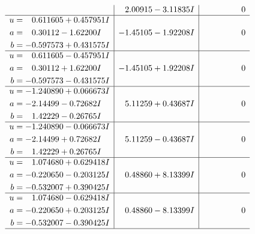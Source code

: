 \documentclass[1p]{elsarticle_modified}
\theoremstyle{definition}
\begin{document}
$$\begin{array}{c|c|c}
 & \phantom{-}2.00915 - 3.11835 I & \phantom{-0.000000 } 0 \\ \hline\begin{aligned}
u &= \phantom{-}0.611605 + 0.457951 I \\
a &= \phantom{-}0.30112 - 1.62200 I \\
b &= -0.597573 + 0.431575 I\end{aligned}
 & -1.45105 - 1.92208 I & \phantom{-0.000000 } 0 \\ \hline\begin{aligned}
u &= \phantom{-}0.611605 - 0.457951 I \\
a &= \phantom{-}0.30112 + 1.62200 I \\
b &= -0.597573 - 0.431575 I\end{aligned}
 & -1.45105 + 1.92208 I & \phantom{-0.000000 } 0 \\ \hline\begin{aligned}
u &= -1.240890 + 0.066673 I \\
a &= -2.14499 - 0.72682 I \\
b &= \phantom{-}1.42229 - 0.26765 I\end{aligned}
 & \phantom{-}5.11259 + 0.43687 I & \phantom{-0.000000 } 0 \\ \hline\begin{aligned}
u &= -1.240890 - 0.066673 I \\
a &= -2.14499 + 0.72682 I \\
b &= \phantom{-}1.42229 + 0.26765 I\end{aligned}
 & \phantom{-}5.11259 - 0.43687 I & \phantom{-0.000000 } 0 \\ \hline\begin{aligned}
u &= \phantom{-}1.074680 + 0.629418 I \\
a &= -0.220650 - 0.203125 I \\
b &= -0.532007 + 0.390425 I\end{aligned}
 & \phantom{-}0.48860 + 8.13399 I & \phantom{-0.000000 } 0 \\ \hline\begin{aligned}
u &= \phantom{-}1.074680 - 0.629418 I \\
a &= -0.220650 + 0.203125 I \\
b &= -0.532007 - 0.390425 I\end{aligned}
 & \phantom{-}0.48860 - 8.13399 I & \phantom{-0.000000 } 0\\
 \hline 
 \end{array}$$\newpage$$\begin{array}{c|c|c}  

\end{array}$$
\end{document}
